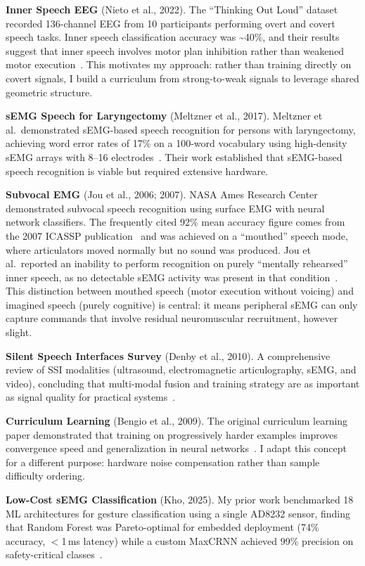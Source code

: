\documentclass{article}
\begin{document}
\textbf{Inner Speech EEG} (Nieto et al., 2022). The ``Thinking Out Loud'' dataset recorded 136-channel EEG from 10 participants performing overt and covert speech tasks. Inner speech classification accuracy was \textasciitilde40\%, and their results suggest that inner speech involves motor plan inhibition rather than weakened motor execution~\cite{nieto2022}. This motivates my approach: rather than training directly on covert signals, I build a curriculum from strong-to-weak signals to leverage shared geometric structure.

\textbf{sEMG Speech for Laryngectomy} (Meltzner et al., 2017). Meltzner et al.\ demonstrated sEMG-based speech recognition for persons with laryngectomy, achieving word error rates of 17\% on a 100-word vocabulary using high-density sEMG arrays with 8--16 electrodes~\cite{meltzner2017}. Their work established that sEMG-based speech recognition is viable but required extensive hardware.

\textbf{Subvocal EMG} (Jou et al., 2006; 2007). NASA Ames Research Center demonstrated subvocal speech recognition using surface EMG with neural network classifiers. The frequently cited 92\% mean accuracy figure comes from the 2007 ICASSP publication~\cite{jou2007} and was achieved on a ``mouthed'' speech mode, where articulators moved normally but no sound was produced. Jou et al.\ reported an inability to perform recognition on purely ``mentally rehearsed'' inner speech, as no detectable sEMG activity was present in that condition~\cite{jou2006}. This distinction between mouthed speech (motor execution without voicing) and imagined speech (purely cognitive) is central: it means peripheral sEMG can only capture commands that involve residual neuromuscular recruitment, however slight.

\textbf{Silent Speech Interfaces Survey} (Denby et al., 2010). A comprehensive review of SSI modalities (ultrasound, electromagnetic articulography, sEMG, and video), concluding that multi-modal fusion and training strategy are as important as signal quality for practical systems~\cite{denby2010}.

\textbf{Curriculum Learning} (Bengio et al., 2009). The original curriculum learning paper demonstrated that training on progressively harder examples improves convergence speed and generalization in neural networks~\cite{bengio2009}. I adapt this concept for a different purpose: hardware noise compensation rather than sample difficulty ordering.

\textbf{Low-Cost sEMG Classification} (Kho, 2025). My prior work benchmarked 18 ML architectures for gesture classification using a single AD8232 sensor, finding that Random Forest was Pareto-optimal for embedded deployment (74\% accuracy, $<$1\,ms latency) while a custom MaxCRNN achieved 99\% precision on safety-critical classes~\cite{kho2026prior}.
\end{document}
